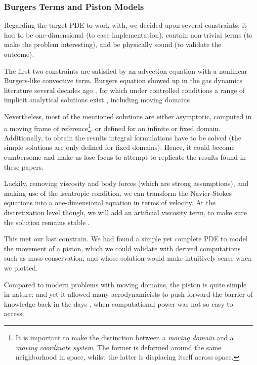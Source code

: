\documentclass[thesis.tex]{subfiles}
\begin{document}
\subsubsection{Burgers Terms and Piston Models}
Regarding the target PDE to work with, we decided upon several constraints:
it had to be one-dimensional (to ease implementation), 
contain non-trivial terms (to make the problem interesting),
and be physically sound (to validate the outcome).

The first two constraints are satisfied by an advection equation with 
a nonlinear Burgers-like convective term.
Burgers equation showed up in the gas dynamics literature several decades ago
\cite{BURGERS1948171,
moran_shen_1966,
1969nonlinearWavePropagationInARelaxingGas,
1951_quasiLinearParabolicEquationOcuringAerodynamics},
for which under controlled conditions 
a range of implicit analytical solutions exist \cite{1972_TableSolutionsBurgers},
including moving domains \cite{2000_burgersMovingDomainAnalytical}.

Nevertheless, most of the mentioned solutions are either asymptotic,
computed in a moving frame of reference\footnote{
    It is important to make the distinction between a \textit{moving domain}
    and a \textit{moving coordinate system}.
    The former is deformed around the same neighborhood in space,
    whilst the latter is displacing itself across space.
}, 
or defined for an infinite or fixed domain.
Additionally, to obtain the results integral formulations have to be solved 
(the simple solutions are only defined for fixed domains).
Hence, it could become cumbersome and make us lose focus to attempt to replicate
the results found in these papers.

Luckily, removing viscosity and body forces (which are strong assumptions), 
and making use of the isentropic condition,
we can transform the Navier-Stokes equations 
into a one-dimensional equation \cite{nonlinearDiffusiveWaves}
in terms of velocity.
At the discretization level though, 
we will add an artificial viscosity term,
to make sure the solution remains stable \cite{2011_artificialViscosityPOD}.

This met our last constrain. 
We had found a simple yet complete PDE to model the movement of a piston, 
which we could validate with derived computations such as mass conservation,
and whose solution would make intuitively sense when we plotted.

Compared to modern problems with moving domains,
the piston is quite simple in nature;
and yet it allowed many aerodynamicists to push forward the barrier of knowledge 
back in the days \cite{1956_PistonTheoryNewAerodynamicTool},
when computational power was not so easy to access. 
\end{document}
